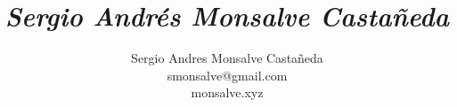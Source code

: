 \documentclass[11pt,letterpaper]{book}
\author{
	Sergio Andres Monsalve Castañeda\\
	smonsalve@gmail.com\\
	monsalve.xyz
}
\title{
	\textbf{
		\textit{
			\large{Sergio Andrés Monsalve Castañeda}\\[2cm]
		}
	}
}
\begin{document}
 
\pagestyle{fancyplain}
\fancyhf{}
\headheight=20pt %
\renewcommand{\headrulewidth}{0pt} %


\fancyfoot[c]{\thepage}

\maketitle

\begin{minipage}{3cm}
\end{minipage}
\cite{Melo2009}




\newpage

\newpage


\end{document}
